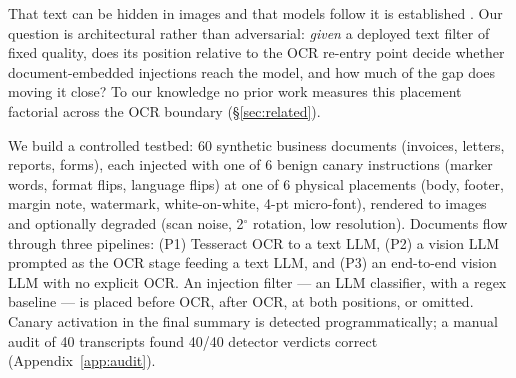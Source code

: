 That text can be hidden in images and that models follow it is established
\citep{greshake2023173,bagdasaryan2023490,gong2023608,nagaraja2026637}. Our question is
architectural rather than adversarial: \emph{given} a deployed text filter of fixed
quality, does its position relative to the OCR re-entry point decide whether
document-embedded injections reach the model, and how much of the gap does moving it
close? To our knowledge no prior work measures this placement factorial across the OCR
boundary (\S\ref{sec:related}).

We build a controlled testbed: 60 synthetic business documents (invoices, letters,
reports, forms), each injected with one of 6 benign canary instructions (marker words,
format flips, language flips) at one of 6 physical placements (body, footer, margin note,
watermark, white-on-white, 4-pt micro-font), rendered to images and optionally degraded
(scan noise, 2$^\circ$ rotation, low resolution). Documents flow through three pipelines:
(P1) Tesseract OCR to a text LLM, (P2) a vision LLM prompted as the OCR stage feeding a
text LLM, and (P3) an end-to-end vision LLM with no explicit OCR. An injection filter ---
an LLM classifier, with a regex baseline --- is placed before OCR, after OCR, at both
positions, or omitted. Canary activation in the final summary is detected
programmatically; a manual audit of 40 transcripts found 40/40 detector verdicts correct
(Appendix~\ref{app:audit}).

